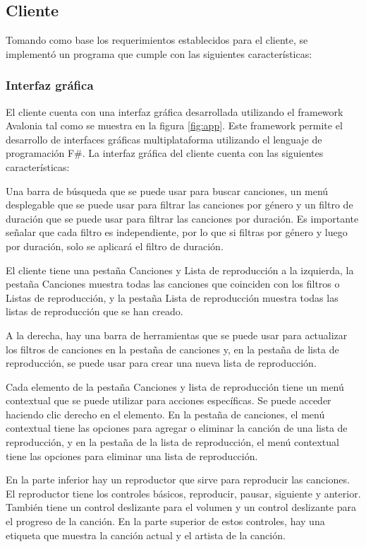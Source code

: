\subsection{Cliente}

Tomando como base los requerimientos establecidos para el cliente, se
implementó un programa que cumple con las siguientes características:

\subsubsection{Interfaz gráfica}

El cliente cuenta con una interfaz gráfica desarrollada utilizando el framework
Avalonia tal como se muestra en la figura \ref{fig:app}. Este framework permite
el desarrollo de interfaces gráficas multiplataforma utilizando el lenguaje de
programación F\#. La interfaz gráfica del cliente cuenta con las siguientes
características:

Una barra de búsqueda que se puede usar para buscar canciones, un menú
desplegable que se puede usar para filtrar las canciones por género y un filtro
de duración que se puede usar para filtrar las canciones por duración. Es
importante señalar que cada filtro es independiente, por lo que si filtras por
género y luego por duración, solo se aplicará el filtro de duración.

El cliente tiene una pestaña Canciones y Lista de reproducción a la izquierda,
la pestaña Canciones muestra todas las canciones que coinciden con los filtros o
Listas de reproducción, y la pestaña Lista de reproducción muestra todas las
listas de reproducción que se han creado.

A la derecha, hay una barra de herramientas que se puede usar para actualizar
los filtros de canciones en la pestaña de canciones y, en la pestaña de lista de
reproducción, se puede usar para crear una nueva lista de reproducción.

Cada elemento de la pestaña Canciones y lista de reproducción tiene un menú
contextual que se puede utilizar para acciones específicas. Se puede acceder
haciendo clic derecho en el elemento. En la pestaña de canciones, el menú
contextual tiene las opciones para agregar o eliminar la canción de una lista de
reproducción, y en la pestaña de la lista de reproducción, el menú contextual
tiene las opciones para eliminar una lista de reproducción.

En la parte inferior hay un reproductor que sirve para reproducir las canciones.
El reproductor tiene los controles básicos, reproducir, pausar, siguiente y
anterior. También tiene un control deslizante para el volumen y un control
deslizante para el progreso de la canción. En la parte superior de estos
controles, hay una etiqueta que muestra la canción actual y el artista de la
canción.


